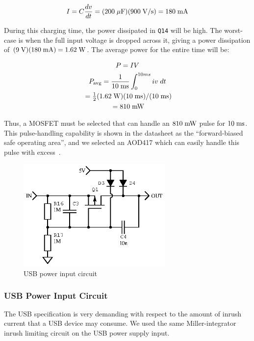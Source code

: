 \begin{equation*}
    I = C \frac{dv}{dt} = (200\;\mathrm{\mu F})(900\;\mathrm{V/s}) = 180\;\mathrm{mA}
\end{equation*}

During this charging time, the power dissipated in \texttt{Q14} will be high.
The worst-case is when the full input voltage is dropped across it, giving
a power dissipation of $(9\;\mathrm{V})(180\;\mathrm{mA}) = 1.62\;\mathrm{W}$. The average
power for the entire time will be:

\begin{gather*}
    P = IV \\
    P_{\mathrm{avg}} = \frac{1}{10\;\mathrm{ms}}\int_0^{10ms} iv\;dt \\
    {}= \tfrac{1}{2}(1.62\;\mathrm{W})(10\;\mathrm{ms})/(10\;\mathrm{ms}) \\
    {}= 810\;\mathrm{mW} \\
\end{gather*}

Thus, a MOSFET must be selected that can handle an $810\;\mathrm{mW}$ pulse for
$10\;\mathrm{ms}$. This pulse-handling capability is shown in the datasheet as
the ``forward-biased safe operating area'', and we selected an AOD417 which
can easily handle this pulse with excess~\cite{aod417}.

\begin{figure}[H]
\centering
\includegraphics[width=3in]{usbinput}
\caption{USB power input circuit}
\label{fig:usbpower}
\end{figure}

\subsubsection{USB Power Input Circuit}

The USB specification is very demanding with respect to the amount of inrush
current that a USB device may consume. We used the same Miller-integrator
inrush limiting circuit on the USB power supply input.

